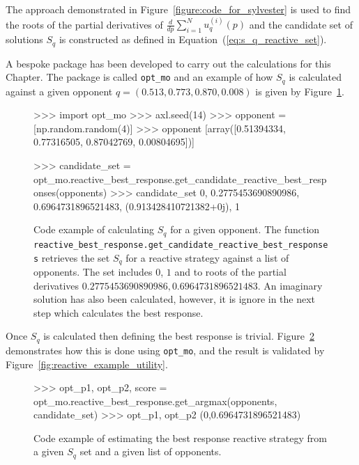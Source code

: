 The approach demonstrated in Figure~\ref{figure:code_for_sylvester} is used to
find the roots of the partial derivatives of \(\frac{d}{dp} \sum\limits_{i=1} ^
N  u_q^{(i)}(p)\) and the candidate set of solutions \(S_q\) is constructed
as defined in Equation~(\ref{eq:s_q_reactive_set}).

A bespoke package has been developed to carry out the calculations for this
Chapter. The package is called \texttt{opt_mo} and an example of
how \(S_q\) is calculated against a given opponent \(q =
(0.513, 0.773, 0.870, 0.008)\) is given by
Figure~\ref{fig:reactive_example_get_candidate_set}.

\begin{figure}[!htbp]
\begin{usagepy}
>>> import opt_mo
>>> axl.seed(14)
>>> opponent = [np.random.random(4)]
>>> opponent
[array([0.51394334, 0.77316505, 0.87042769, 0.00804695])]

>>> candidate_set = opt_mo.reactive_best_response.get_candidate_reactive_best_responses(opponents)
>>> candidate_set
{0, 0.2775453690890986, 0.6964731896521483, (0.913428410721382+0j), 1}
\end{usagepy}
\caption{Code example of calculating \(S_q\) for a given opponent. The function
\texttt{reactive_best_response.get_candidate_reactive_best_responses}
retrieves the set \(S_q\) for a reactive strategy against a list of opponents.
The set includes \(0\), \(1\) and to roots of the partial derivatives
\(0.2775453690890986, 0.6964731896521483\). An imaginary solution has also been
calculated, however, it is ignore in the next step which calculates the best
response.}\label{fig:reactive_example_get_candidate_set}
\end{figure}

Once \(S_q\) is calculated then defining the best response is trivial.
Figure~\ref{fig:reactive_example_best_response} demonstrates how this is done
using \texttt{opt_mo}, and the result is validated by
Figure~\ref{fig:reactive_example_utility}.

\begin{figure}[!htbp]
    \begin{usagepy}
>>> opt_p1, opt_p2, score = opt_mo.reactive_best_response.get_argmax(opponents, candidate_set)
>>> opt_p1, opt_p2 (0,0.6964731896521483)
\end{usagepy}
\caption{Code example of estimating the best response
reactive strategy from a given \(S_q\) set and a given list of
opponents.}\label{fig:reactive_example_best_response}
\end{figure}

